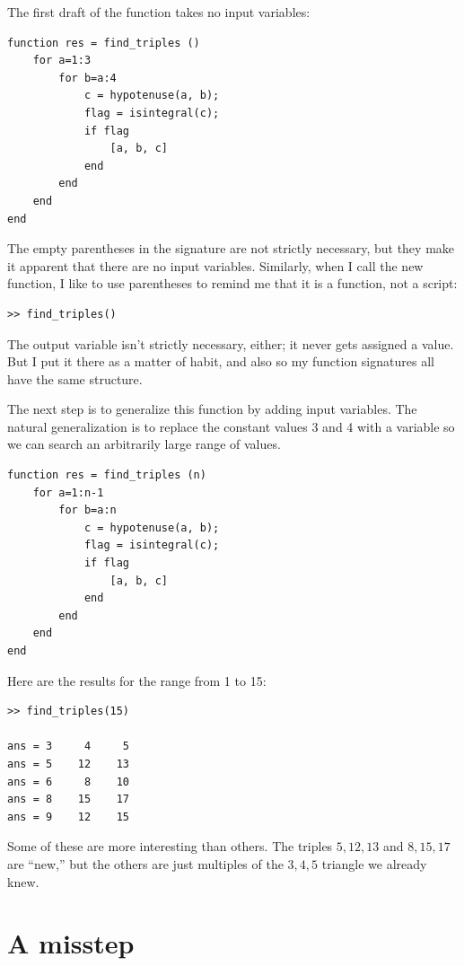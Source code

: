 \documentclass[
]{book}
\begin{document}
The first draft of the function takes no input variables:

\begin{verbatim}
function res = find_triples ()
    for a=1:3
        for b=a:4
            c = hypotenuse(a, b);
            flag = isintegral(c);
            if flag
                [a, b, c]
            end
        end
    end
end
\end{verbatim}

The empty parentheses in the signature are not strictly necessary, but
they make it apparent that there are no input variables.  Similarly,
when I call the new function, I like to use parentheses to remind me
that it is a function, not a script:

\begin{verbatim}
>> find_triples()
\end{verbatim}

The output variable isn't strictly necessary, either; it
never gets assigned a value.  But I put it there as a matter of
habit, and also so my function signatures all have the same structure.

The next step is to generalize this function by adding input
variables.  The natural generalization is to replace the constant
values 3 and 4 with a variable so we can search an arbitrarily large
range of values.

\begin{verbatim}
function res = find_triples (n)
    for a=1:n-1
        for b=a:n
            c = hypotenuse(a, b);
            flag = isintegral(c);
            if flag
                [a, b, c]
            end
        end
    end
end
\end{verbatim}

Here are the results for the range from 1 to 15:

\begin{verbatim}
>> find_triples(15)

ans = 3     4     5
ans = 5    12    13
ans = 6     8    10
ans = 8    15    17
ans = 9    12    15
\end{verbatim}

Some of these are more interesting than others.  The triples
$5,12,13$ and $8,15,17$ are ``new,'' but the others are just
multiples of the $3,4,5$ triangle we already knew.


\section{A misstep}
\end{document}

